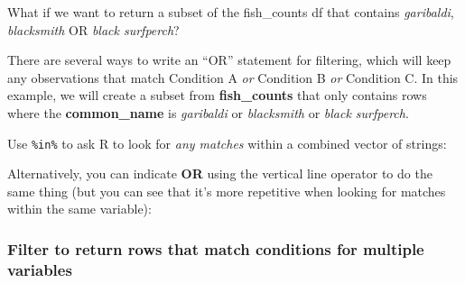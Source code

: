 \documentclass[]{book}
\newenvironment{Shaded}{\begin{snugshade}}{\end{snugshade}}
\newcommand{\KeywordTok}[1]{\textcolor[rgb]{0.13,0.29,0.53}{\textbf{#1}}}
\newcommand{\NormalTok}[1]{#1}
\newcommand{\OperatorTok}[1]{\textcolor[rgb]{0.81,0.36,0.00}{\textbf{#1}}}
\newcommand{\StringTok}[1]{\textcolor[rgb]{0.31,0.60,0.02}{#1}}
\begin{document}
What if we want to return a subset of the fish\_counts df that contains \emph{garibaldi}, \emph{blacksmith} OR \emph{black surfperch}?

There are several ways to write an ``OR'' statement for filtering, which will keep any observations that match Condition A \emph{or} Condition B \emph{or} Condition C. In this example, we will create a subset from \textbf{fish\_counts} that only contains rows where the \textbf{common\_name} is \emph{garibaldi} or \emph{blacksmith} or \emph{black surfperch}.

Use \texttt{\%in\%} to ask R to look for \emph{any matches} within a combined vector of strings:

\begin{Shaded}
\end{Shaded}

Alternatively, you can indicate \textbf{OR} using the vertical line operator \texttt{\textbar{}} to do the same thing (but you can see that it's more repetitive when looking for matches within the same variable):

\begin{Shaded}
\end{Shaded}

\hypertarget{filter-to-return-rows-that-match-conditions-for-multiple-variables}{%
\subsubsection{Filter to return rows that match conditions for multiple variables}\label{filter-to-return-rows-that-match-conditions-for-multiple-variables}}
\end{document}
